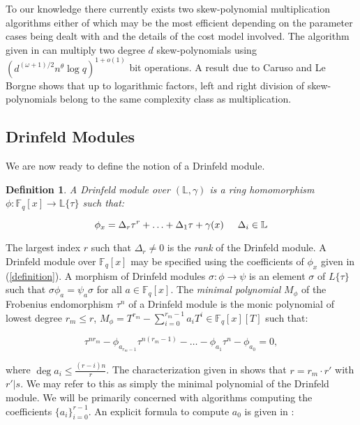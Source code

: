\documentclass[sigconf]{acmart}
\newtheorem{definition}{Definition}
\newcommand{\F}{\mathbb{F}}
\renewcommand{\L}{\mathbb{L}}
\begin{document}
To our knowledge there currently exists two skew-polynomial multiplication algorithms either of which may be the most efficient depending on the parameter cases being dealt with and the details of the cost model involved. The algorithm given in \cite{PuchingerW15} can multiply two degree $d$ skew-polynomials using $(d^{(\omega + 1)/2}n^{\theta} \log q)^{1 + o(1)}$ bit operations. A result due to Caruso and Le Borgne \cite{CaLe17} shows that up to logarithmic factors, left and right division of skew-polynomials belong to the same complexity class as multiplication.

\subsection{Drinfeld Modules}

We are now ready to define the notion of a Drinfeld module.

\begin{definition}
A \emph{Drinfeld module} over $(\L, \gamma)$ is a ring homomorphism $\phi: \F_q[x] \to \L\{ \tau \}$ such that:
\end{definition}

\begin{equation}\label{definition}
    \phi_x = \Delta_r \tau^r + \ldots + \Delta_1 \tau + \gamma(x) 
    \hspace{5mm} \Delta_i \in \L
\end{equation}

The largest index $r$ such that $\Delta_r \neq 0$ is the \textit{rank} of the Drinfeld module. A Drinfeld module over $\F_q[x]$ may be specified using the coefficients of $\phi_x$ given in (\ref{definition}). A morphism of Drinfeld modules $\sigma: \phi \to \psi$ is an element $\sigma$ of $L\{ \tau \}$ such that $\sigma \phi_a = \psi_a \sigma$ for all $a \in \F_q[x]$. The \textit{minimal polynomial} $M_{\phi}$ of the Frobenius endomorphism $\tau^n$ of a Drinfeld module is the monic polynomial of lowest degree $r_m \leq r$, $M_{\phi} = T^{r_m} - \sum_{i=0}^{r_m - 1} a_iT^i \in \F_q[x][T]$ such that:

\begin{equation}\label{characteristic}
    \tau^{n r_m} - \phi_{a_{r_m-1}}\tau^{n(r_m -1)} - \ldots - \phi_{a_1} \tau^n - \phi_{a_0} = 0, 
\end{equation}

where $\deg a_i \leq \frac{(r - i)n}{r}$. The characterization given in \cite{assong2020explicit} shows that $r = r_m \cdot r'$ with $ r' | s$. We may refer to this as simply the minimal polynomial of the Drinfeld module. We will be primarily concerned with algorithms computing the coefficients $\{ a_i \}_{i=0}^{r-1}$. An explicit formula to compute $a_0$ is given in \cite{GaPa18}:
\end{document}
